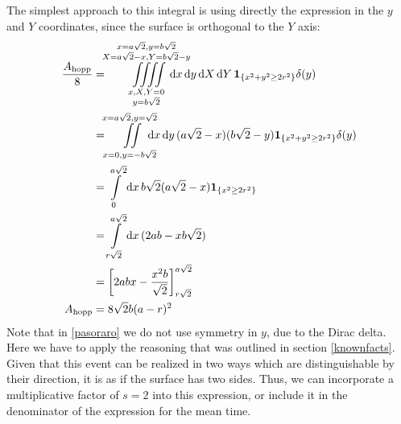 \documentclass[superscriptaddress,pre,reprint,showpacs,twocolumn]{revtex4-1}
\newcommand{\rd}[1]{\mathrm{d}{#1} \,}
\newcommand{\indicatorsymbol}{\mathbf{1}}
\newcommand{\indicator}[1]{\indicatorsymbol_{ \{   #1 \} } }
\begin{document}
The simplest approach to this integral is using directly the expression in the $y$ and $Y$
coordinates, since the surface is orthogonal to the $Y$ axis:
  \begin{align} 
    \frac{A_\text{hopp}}{8} & = \iiiint \limits_
      {\substack{x, X, Y=0 \\ y=b\sqrt{2}}}^
               {\substack{x=a\sqrt{2}, y=b\sqrt{2} \\
                   X=a\sqrt{2}-x, Y =b \sqrt{2}-y }}
                \mkern-36mu
     \rd x   \rd y  \rd X   \rd Y
     \indicator{x^2+y^2 \geq 2 r^2} \delta (y)
     \label{pasoraro}
     \\   
     &=  \iint \limits_{x=0, y=-b\sqrt{2}}^{x=a\sqrt{2}, y=\sqrt{2}}
    \mkern-18mu  \rd x \rd y 
    (a\sqrt{2}-x)(b\sqrt{2}-y)
    \indicator{x^2+y^2 \geq 2 r^2} \delta (y)
    \\
    &= \int \limits _0^{a\sqrt{2}} \rd x
    b\sqrt{2} (a\sqrt{2}-x)
    \indicator{x^2\geq 2 r^2}
    \\
    &= \int\limits_{r\sqrt{2}}^{a\sqrt{2}} \rd x
    (2ab-xb\sqrt{2})
    \\
    &=\biggl[2abx-\frac{x^2b}{\sqrt{2}} \biggr]_{r\sqrt{2}}^{a\sqrt{2}}\\
      A_\text{hopp}&=8\sqrt{2}b(a-r)^2
  \end{align}
  Note that in \eqref{pasoraro} we do not use symmetry in
  $y$, due to the Dirac delta.
  Here we have to apply the reasoning that was outlined in section \ref{knownfacts}.
  Given that this event can be realized in two ways which are
  distinguishable by their direction, it is as if the surface has two sides.
  Thus, we can incorporate a multiplicative factor of $s=2$ into this expression, or include it in the denominator of 
  the expression for the mean time.
\end{document}
